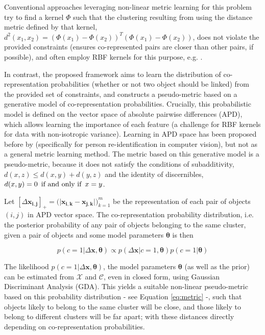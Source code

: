 Conventional approaches leveraging non-linear metric learning for this problem try to find a kernel $\Phi$ such that the clustering resulting from using the distance metric defined by that kernel, $d^2(x_1, x_2)=(\Phi(x_1)-\Phi(x_2))^T(\Phi(x_1)-\Phi(x_2))$, does not violate the provided constraints (ensures co-represented pairs are closer than other pairs, if possible), and often employ RBF kernels for this purpose, e.g. \citep{baghshah2010kernel, chitta2011approximate}. 

In contrast, the proposed framework aims to learn the distribution of co-representation probabilities (whether or not two object should be linked) from the provided set of constraints, and constructs a pseudo-metric based on a generative model of co-representation probabilities. Crucially, this probabilistic model is defined on the vector space of absolute pairwise differences (APD), which allows learning the importance of each feature (a challenge for RBF kernels for data with non-isotropic variance). Learning in APD space has been proposed before by \cite{zheng2011person} (specifically for person re-identification in computer vision), but not as a general metric learning method. The metric based on this generative model is a pseudo-metric, because it does not satisfy the conditions of subadditivity, $d(x, z) \leq d(x, y)+d(y,z)$ and the identity of discernibles, $d(x, y) = 0 \enskip \text{if and only if} \enskip x = y$.

Let $[\Delta \boldsymbol{x_{i,j}}]_+ = \big( \lvert \boldsymbol{x_{i,k}} - \boldsymbol{x_{j,k}} \lvert \big)_{k=1}^m $ be the representation of each pair of objects $(i,j)$ in APD vector space. The co-representation probability distribution, i.e. the posterior probability of any pair of objects belonging to the same cluster, given a pair of objects and some model parameters $\boldsymbol{\theta}$ is then 

\begin{equation}
\label{eq:linkprob}
p(c=1|\Delta \boldsymbol{x}, \boldsymbol{\theta}) \propto p(\Delta \boldsymbol{x} | c=1, \boldsymbol{\theta}) p(c=1|\boldsymbol{\theta})
\end{equation}

The likelihood $ p(c=1|\Delta \boldsymbol{x}, \boldsymbol{\theta}) $, the model parameters $ \boldsymbol{\theta} $ (as well as the prior) can be estimated from $\mathcal{X}$ and $\mathcal{C}$, even in closed form, using Gaussian Discriminant Analysis (GDA). This yields a suitable non-linear pseudo-metric based on this probability distribution - see Equation \ref{eq:metric} -, such that objects likely to belong to the same cluster will be close, and those likely to belong to different clusters will be far apart; with these distances directly depending on co-representation probabilities. 

